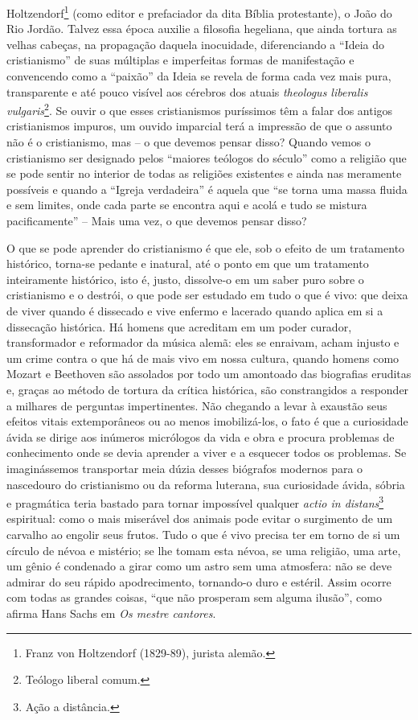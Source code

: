 Holtzendorf\footnote{Franz von Holtzendorf (1829-89), jurista alemão.}
(como editor e prefaciador da dita Bíblia protestante), o João do Rio
Jordão. Talvez essa época auxilie a filosofia hegeliana, que ainda
tortura as velhas cabeças, na propagação daquela inocuidade,
diferenciando a ``Ideia do cristianismo'' de suas múltiplas e
imperfeitas formas de manifestação e convencendo como a ``paixão'' da
Ideia se revela de forma cada vez mais pura, transparente e até pouco
visível aos cérebros dos atuais \emph{theologus liberalis
vulgaris}\footnote{Teólogo liberal comum.}. Se ouvir o que esses
cristianismos puríssimos têm a falar dos antigos cristianismos impuros,
um ouvido imparcial terá a impressão de que o assunto não é o
cristianismo, mas -- o que devemos pensar disso? Quando vemos o
cristianismo ser designado pelos ``maiores teólogos do século'' como a
religião que se pode sentir no interior de todas as religiões existentes
e ainda nas meramente possíveis e quando a ``Igreja verdadeira'' é
aquela que ``se torna uma massa fluida e sem limites, onde cada parte se
encontra aqui e acolá e tudo se mistura pacificamente'' -- Mais uma vez,
o que devemos pensar disso?

O que se pode aprender do cristianismo é que ele, sob o efeito de um
tratamento histórico, torna-se pedante e inatural, até o ponto em que um
tratamento inteiramente histórico, isto é, justo, dissolve-o em um saber
puro sobre o cristianismo e o destrói, o que pode ser estudado em tudo o
que é vivo: que deixa de viver quando é dissecado e vive enfermo e
lacerado quando aplica em si a dissecação histórica. Há homens que
acreditam em um poder curador, transformador e reformador da música
alemã: eles se enraivam, acham injusto e um crime contra o que há de
mais vivo em nossa cultura, quando homens como Mozart e Beethoven são
assolados por todo um amontoado das biografias eruditas e, graças ao
método de tortura da crítica histórica, são constrangidos a responder a
milhares de perguntas impertinentes. Não chegando a levar à exaustão
seus efeitos vitais extemporâneos ou ao menos imobilizá-los, o fato é
que a curiosidade ávida se dirige aos inúmeros micrólogos da vida e obra
e procura problemas de conhecimento onde se devia aprender a viver e a
esquecer todos os problemas. Se imaginássemos transportar meia dúzia
desses biógrafos modernos para o nascedouro do cristianismo ou da
reforma luterana, sua curiosidade ávida, sóbria e pragmática teria
bastado para tornar impossível qualquer \emph{actio in
distans}\footnote{Ação a distância.} espiritual: como o mais miserável
dos animais pode evitar o surgimento de um carvalho ao engolir seus
frutos. Tudo o que é vivo precisa ter em torno de si um círculo de névoa
e mistério; se lhe tomam esta névoa, se uma religião, uma arte, um gênio
é condenado a girar como um astro sem uma atmosfera: não se deve admirar
do seu rápido apodrecimento, tornando-o duro e estéril. Assim ocorre com
todas as grandes coisas, ``que não prosperam sem alguma ilusão'', como
afirma Hans Sachs em \emph{Os mestre cantores}.

